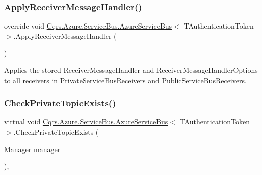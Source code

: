 \subsubsection{\texorpdfstring{Apply\+Receiver\+Message\+Handler()}{ApplyReceiverMessageHandler()}}
{\footnotesize\ttfamily override void \hyperlink{classCqrs_1_1Azure_1_1ServiceBus_1_1AzureServiceBus}{Cqrs.\+Azure.\+Service\+Bus.\+Azure\+Service\+Bus}$<$ T\+Authentication\+Token $>$.Apply\+Receiver\+Message\+Handler (\begin{DoxyParamCaption}{ }\end{DoxyParamCaption})\hspace{0.3cm}{\ttfamily [protected]}}



Applies the stored Receiver\+Message\+Handler and Receiver\+Message\+Handler\+Options to all receivers in \hyperlink{classCqrs_1_1Azure_1_1ServiceBus_1_1AzureServiceBus_aabe85675218dd5d535459850fff1b322_aabe85675218dd5d535459850fff1b322}{Private\+Service\+Bus\+Receivers} and \hyperlink{classCqrs_1_1Azure_1_1ServiceBus_1_1AzureServiceBus_a6498253027d0f613f76e0b8c8112da1e_a6498253027d0f613f76e0b8c8112da1e}{Public\+Service\+Bus\+Receivers}. 

\mbox{\label{classCqrs_1_1Azure_1_1ServiceBus_1_1AzureServiceBus_ab0cafe4b76db0e35dce9b04cba464c50_ab0cafe4b76db0e35dce9b04cba464c50}} 
\subsubsection{\texorpdfstring{Check\+Private\+Topic\+Exists()}{CheckPrivateTopicExists()}}
{\footnotesize\ttfamily virtual void \hyperlink{classCqrs_1_1Azure_1_1ServiceBus_1_1AzureServiceBus}{Cqrs.\+Azure.\+Service\+Bus.\+Azure\+Service\+Bus}$<$ T\+Authentication\+Token $>$.Check\+Private\+Topic\+Exists (\begin{DoxyParamCaption}\item[{Manager}]{manager }\end{DoxyParamCaption})\hspace{0.3cm}{\ttfamily [protected]}, {\ttfamily [virtual]}}



